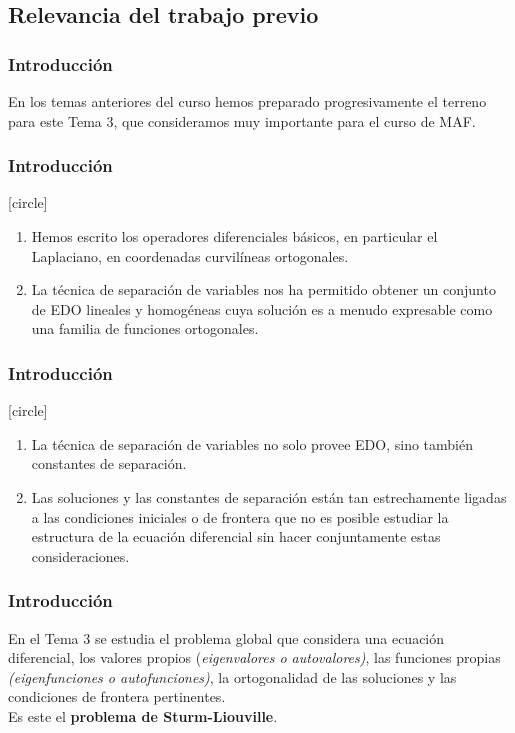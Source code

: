 \subsection{Relevancia del trabajo previo}
\begin{frame}
\frametitle{Introducción}
En los temas anteriores del curso hemos preparado progresivamente el terreno para este Tema 3, que consideramos muy importante para el curso de MAF.
\end{frame}
\begin{frame}
\frametitle{Introducción}
[circle]
\begin{enumerate}[<+->]
\item Hemos escrito los operadores diferenciales básicos, en particular el Laplaciano, en coordenadas curvilíneas ortogonales.
\item La técnica de separación de variables nos ha permitido obtener un conjunto de EDO lineales y homogéneas cuya solución es a menudo expresable como una familia de funciones ortogonales.
\seti
\end{enumerate}
\end{frame}
\begin{frame}
\frametitle{Introducción}
[circle]
\begin{enumerate}[<+->]
\conti
\item La técnica de separación de variables no solo provee EDO, sino también constantes de separación.
\item Las soluciones y las constantes de separación están tan estrechamente ligadas a las condiciones iniciales o de frontera que no es posible estudiar la estructura de la ecuación diferencial sin hacer conjuntamente estas consideraciones.
\end{enumerate}
\end{frame}
\begin{frame}
\frametitle{Introducción}
En el Tema 3 se estudia el problema global que considera una ecuación diferencial, los valores propios (\emph{eigenvalores o autovalores)}, las funciones propias \emph{(eigenfunciones o autofunciones)}, la ortogonalidad de las soluciones y las condiciones de frontera pertinentes.
\\
\bigskip
\pause
Es este el \textbf{problema de Sturm-Liouville}.
\end{frame}
